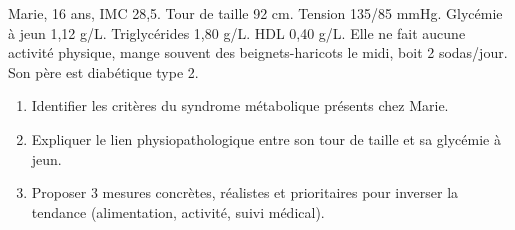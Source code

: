 \documentclass[11pt]{article}
\begin{document}
\begin{exercice}
Marie, 16 ans, IMC 28,5. Tour de taille 92 cm. Tension 135/85 mmHg. Glycémie à jeun 1,12 g/L. Triglycérides 1,80 g/L. HDL 0,40 g/L. Elle ne fait aucune activité physique, mange souvent des beignets-haricots le midi, boit 2 sodas/jour. Son père est diabétique type 2.
\begin{enumerate}
    \item Identifier les critères du syndrome métabolique présents chez Marie.
    \item Expliquer le lien physiopathologique entre son tour de taille et sa glycémie à jeun.
    \item Proposer 3 mesures concrètes, réalistes et prioritaires pour inverser la tendance (alimentation, activité, suivi médical).
\end{enumerate}
\end{exercice}
\end{document}
